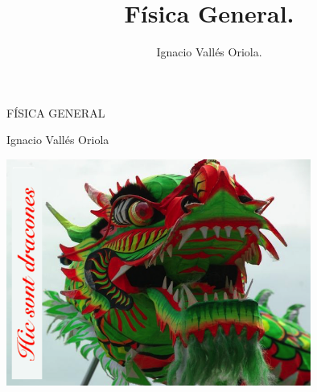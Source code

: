 \documentclass[a5paper, 10pt, spanish]{book}
\title{Física General.}
\author{Ignacio Vallés Oriola.}
\date{}
\numberwithin{equation}{chapter}
\numberwithin{teor}{chapter}
\numberwithin{coro}{chapter}
\numberwithin{prop}{chapter}
\numberwithin{defi}{chapter}
\numberwithin{axio}{chapter}
\numberwithin{ejem}{chapter}
\numberwithin{ejer}{chapter}
\numberwithin{ejre}{chapter}
\numberwithin{ayud}{chapter}
\numberwithin{solu}{chapter}
\numberwithin{prob}{chapter}
\begin{document}
\begin{titlepage}
	\centering
	\vspace*{\fill}
	{\scshape\LARGE FÍSICA GENERAL\par}
	\vspace{1cm}
	{\Large Ignacio Vallés Oriola \par}
	\vspace{3cm}
	\includegraphics[width=0.75\textwidth]{imagenes/hic-svnt-dracones}
	\vspace{3cm}
\end{titlepage}

\tableofcontents






























\appendix

		
\end{document}
